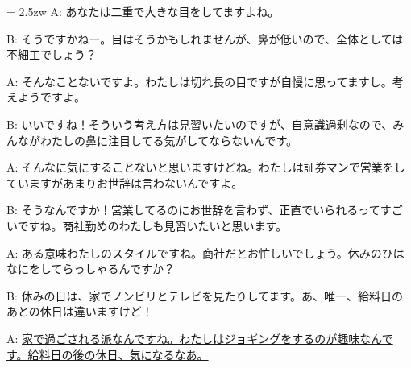 \documentclass[11pt]{amsart}
\title{}
\author{}
\newenvironment{hangall}[1]{\hangindent = 2.5zw\everypar{\hangindent = 2.5zw}}{}
\begin{document}
\maketitle
\begin{hangall}{}%
A: あなたは二重で大きな目をしてますよね。

B: そうですかねー。目はそうかもしれませんが、鼻が低いので、全体としては不細工でしょう？

A: そんなことないですよ。わたしは切れ長の目ですが自慢に思ってますし。考えようですよ。

B: いいですね！そういう考え方は見習いたいのですが、自意識過剰なので、みんながわたしの鼻に注目してる気がしてならないんです。

A: そんなに気にすることないと思いますけどね。わたしは証券マンで営業をしていますがあまりお世辞は言わないんですよ。

B: そうなんですか！営業してるのにお世辞を言わず、正直でいられるってすごいですね。商社勤めのわたしも見習いたいと思います。

A: ある意味わたしのスタイルですね。商社だとお忙しいでしょう。休みのひはなにをしてらっしゃるんですか？

B: 休みの日は、家でノンビリとテレビを見たりしてます。あ、唯一、給料日のあとの休日は違いますけど！

A: \ul{家で過ごされる派なんですね。わたしはジョギングをするのが趣味なんです。給料日の後の休日、気になるなあ。}\end{hangall}
\end{document}
